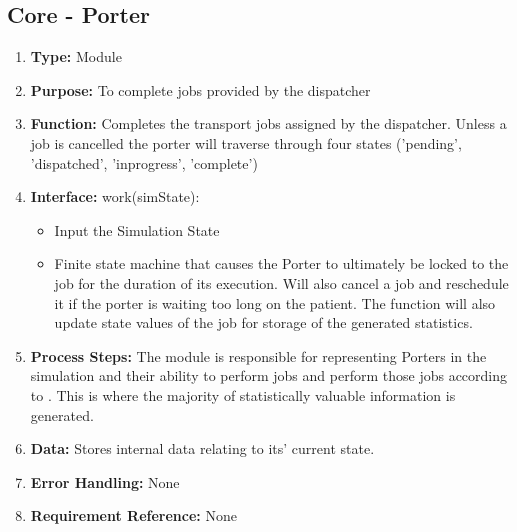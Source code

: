 \documentclass[paper=letter, fontsize=10pt]{scrartcl}
\numberwithin{equation}{section}		%
\numberwithin{figure}{section}			%
\numberwithin{table}{section}				%
\begin{document}
\subsection{Core - Porter}
\begin{enumerate}[]
	\item \textbf{Type:} Module
	\item \textbf{Purpose:}  To complete jobs provided by the dispatcher
	\item \textbf{Function:} Completes the transport jobs assigned by the dispatcher.  Unless a job is cancelled the porter will traverse through four states ('pending', 'dispatched', 'inprogress', 'complete')
	\item \textbf{Interface:} \newline
	work(simState):
		\begin{itemize}
			\item Input the Simulation State
			\item Finite state machine that causes the Porter to ultimately be locked to the job for the duration of its execution. Will also cancel a job and reschedule it if the porter is waiting too long on the patient. The function will also update state values of the job for storage of the generated statistics.
		\end{itemize}
	\item \textbf{Process Steps:} The module is responsible for representing Porters in the simulation and their ability to perform jobs and perform those jobs according to . This is where the majority of statistically valuable information is generated.
	\item \textbf{Data:} Stores internal data relating to its' current state.
	\item \textbf{Error Handling:} None
	\item \textbf{Requirement Reference:} None
\end{enumerate}
\end{document}
